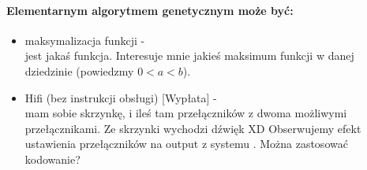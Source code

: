 \documentclass{article}
\begin{document}
		\paragraph{Elementarnym algorytmem genetycznym może być:}
		\begin{itemize}
			\item maksymalizacja funkcji - \\
		jest jakaś funkcja. Interesuje mnie jakieś maksimum funkcji w danej dziedzinie (powiedzmy $0<a<b$).
		
			\item Hifi (bez instrukcji obsługi) [Wypłata] - \\
		mam sobie skrzynkę, i ileś tam przełączników z dwoma możliwymi przełącznikami. 	Ze skrzynki wychodzi dźwięk XD Obserwujemy efekt ustawienia przełączników na 	output z systemu . Można zastosować kodowanie?
		
		\end{itemize}
\end{document}
